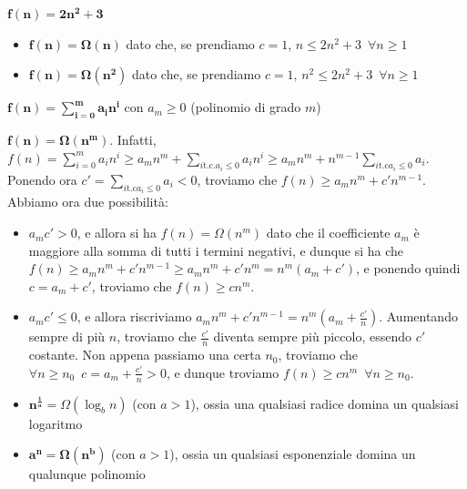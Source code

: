 \documentclass[11pt, a4paper, titlepage, oneside]{scrbook}
\begin{document}
\Esempi \nopagebreak

$\bm{f(n) = 2n^2 + 3}$ \nopagebreak

\begin{itemize}
    \item $\bm{f(n) = \Omega(n)}$ dato che, se prendiamo $c = 1$, $n \leq 2n^2 + 3 \enspace \forall n \geq 1$
    \item $\bm{f(n) = \Omega(n^2)}$ dato che, se prendiamo $c = 1$, $n^2 \leq 2n^2 + 3 \enspace \forall n \geq 1$
\end{itemize}

\Separatore

$\bm{f(n) = \sum_{i = 0}^m a_in^i}$ con $a_m \geq 0$ (polinomio di grado $m$) \nopagebreak

$\bm{f(n) = \Omega(n^m)}$. Infatti, $f(n) = \sum_{i = 0}^m a_i n^i \geq a_m n^m + \sum_{i \text{t.c.} a_i  \leq 0} a_i n^i \geq a_m n^m + n^{m-1} \sum_{i \text{t.c} a_i \leq 0} a_i$. Ponendo ora $c' = \sum_{i \text{t.c} a_i \leq 0} a_i < 0$, troviamo che $f(n) \geq a_m n^m + c' n^{m-1}$. Abbiamo ora due possibilità:
\begin{itemize}
    \item $a_m c' > 0$, e allora si ha $f(n) = \Omega(n^m)$ dato che il coefficiente $a_m$ è maggiore alla somma di tutti i termini negativi, e dunque si ha che \mbox{$f(n) \geq a_m n^m + c'n^{m-1} \geq a_m n^m + c'n^m = n^m(a_m + c')$}, e ponendo quindi $c = a_m + c'$, troviamo che $f(n) \geq c n^m$. 
    \item $a_m c' \leq 0$, e allora riscriviamo $a_m n^m + c' n^{m-1} = n^m (a_m + \frac{c'}{n})$. Aumentando sempre di più $n$, troviamo che $\frac{c'}{n}$ diventa sempre più piccolo, essendo $c'$ costante. Non appena passiamo una certa $n_0$, troviamo che \mbox{$\forall n \geq n_0 \enspace c = a_m + \frac{c'}{n} > 0$}, e dunque troviamo $f(n) \geq c n^m \enspace \forall n \geq n_0$. 
\end{itemize}

\begin{Proprieta}
\label{prop-regole-generali-Gamma}
\begin{itemize}
    \item $\bm{n^{\frac{1}{a}}} = \Omega(\log_b n)$ (con $a > 1$), ossia una qualsiasi radice domina un qualsiasi logaritmo
    \item $\bm{a^n = \Omega(n^b)}$ (con $a > 1$), ossia un qualsiasi esponenziale domina un qualunque polinomio
\end{itemize}
\end{Proprieta}
\end{document}
